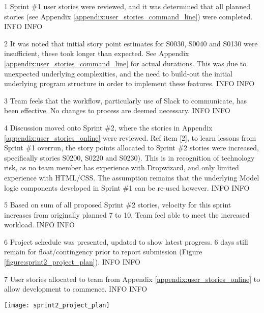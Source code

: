 \begin{momitems}
	\momitem
	{1}
	{Sprint \#1 user stories were reviewed, and it was determined that all planned stories (see Appendix \ref{appendix:user_stories_command_line}) were completed.}
	{INFO}
	{INFO}

	\momitem
	{2}
	{It was noted that initial story point estimates for S0030, S0040 and S0130 were insufficient, these took longer than expected. 
	See Appendix \ref{appendix:user_stories_command_line} for actual durations. 
	This was due to unexpected underlying complexities, and the need to build-out the initial underlying program structure in order to implement these features.}
	{INFO}
	{INFO}

	\momitem
	{3}
	{Team feels that the workflow, particularly use of Slack to communicate, has been effective. 
	No changes to process are deemed necessary.}
	{INFO}
	{INFO}

	\momitem
	{4}
	{Discussion moved onto Sprint \#2, where the stories in Appendix \ref{appendix:user_stories_online} were reviewed.
	Ref item [2], to learn lessons from Sprint \#1 overrun, the story points allocated to Sprint \#2 stories were increased, specifically stories S0200, S0220 and S0230).
	This is in recognition of technology risk, as no team member has experience with Dropwizard, and only limited experience with HTML/CSS.
	The assumption remains that the underlying Model logic components developed in Sprint \#1 can be re-used however.}
	{INFO}
	{INFO}

	\momitem
	{5}
	{Based on sum of all proposed Sprint \#2 stories, velocity for this sprint increases from originally planned 7 to 10.
	Team feel able to meet the increased workload.}
	{INFO}
	{INFO}

	\momitem
	{6}
	{Project schedule was presented, updated to show latest progress. 6 days still remain for float/contingency prior to report submission (Figure \ref{figure:sprint2_project_plan}).}
	{INFO}
	{INFO}

	\momitem
	{7}
	{User stories allocated to team from Appendix \ref{appendix:user_stories_online} to allow development to commence.}
	{INFO}
	{INFO}
\end{momitems}

\begin{center}
	\texttt{[image: sprint2\_project\_plan]}
	\label{figure:sprint2_project_plan}
\end{center}


